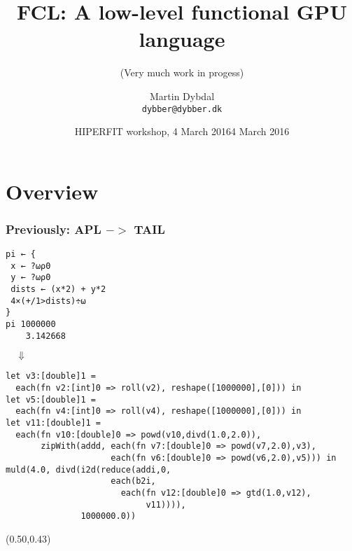 \documentclass{beamer}
\title[FCL] %
  {FCL: A low-level functional GPU language} %
\subtitle{(Very much work in progess)}
\author{\footnotesize{Martin Dybdal} \\ \footnotesize{\texttt{dybber@dybber.dk}}}
\institute {
HIPERFIT \\
DIKU \\
University of Copenhagen
}
\date{\footnotesize{HIPERFIT workshop, 4 March 2016}}
\date[4 March 2016]{4 March 2016}
\begin{document}
{
\begin{frame}
  \titlepage

\end{frame}
}





\section{Overview}

\begin{frame}[fragile]
\frametitle{Previously: APL $->$ TAIL}
{\footnotesize
\begin{verbatim}
pi ← { 
 x ← ?⍵⍴0
 y ← ?⍵⍴0
 dists ← (x*2) + y*2
 4×(+/1>dists)÷⍵
}
pi 1000000
    3.142668
\end{verbatim}
\pause
\vspace{-2mm}
$\quad\Downarrow$
\vspace{-2mm}
\begin{verbatim}
let v3:[double]1 = 
  each(fn v2:[int]0 => roll(v2), reshape([1000000],[0])) in
let v5:[double]1 =
  each(fn v4:[int]0 => roll(v4), reshape([1000000],[0])) in
let v11:[double]1 = 
  each(fn v10:[double]0 => powd(v10,divd(1.0,2.0)),
       zipWith(addd, each(fn v7:[double]0 => powd(v7,2.0),v3),
                     each(fn v6:[double]0 => powd(v6,2.0),v5))) in
muld(4.0, divd(i2d(reduce(addi,0,
                     each(b2i,
                       each(fn v12:[double]0 => gtd(1.0,v12),
                            v11)))),
               1000000.0))
\end{verbatim}
}

\begin{textblock*}{64mm}(0.50\textwidth,0.43\textheight)
\end{textblock*}

\end{frame}
\end{document}
